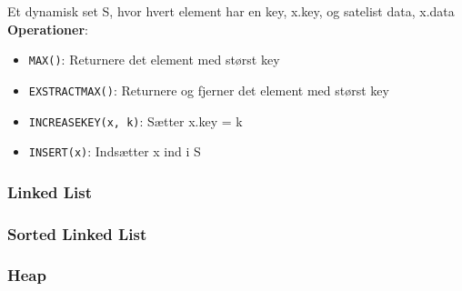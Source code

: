 Et dynamisk set S, hvor hvert element har en key, x.key, og satelist data, x.data\\
\textbf{Operationer}:
\begin{itemize}
	\item \texttt{MAX()}: Returnere det element med størst key
	\item \texttt{EXSTRACTMAX()}: Returnere og fjerner det element med størst key
	\item \texttt{INCREASEKEY(x, k)}: Sætter x.key = k
	\item \texttt{INSERT(x)}: Indsætter x ind i S
\end{itemize}
	
\subsubsection{Linked List}

\newpage

\subsubsection{Sorted Linked List}

\newpage

\subsubsection{Heap}

